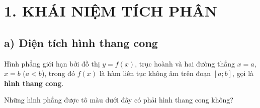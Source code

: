 \documentclass[12pt,a4paper]{extarticle}
\begin{document}
\makeheadbox[headerright={Chương 4},chude={Bài 2},tieude={Tích phân},dinhdang={Giải tích},lop={12 },gv={Nguyễn Lê Minh Ngọc}]
\vspace{2em}
\section*{\color{blue!80!black}1. KHÁI NIỆM TÍCH PHÂN}
\subsection*{\color{blue!80!black}a) Diện tích hình thang cong}
\begin{tcolorbox}[
    colback=blue!5!white,
    colframe=blue!75!black,
    sharp corners,
    boxrule=0pt,
    leftrule=3pt,
    top=8pt,
    bottom=8pt,
    left=12pt
]
    Hình phẳng giới hạn bởi đồ thị $y = f(x)$, trục hoành và hai đường thẳng $x = a$, $x = b$ ($a < b$), trong đó $f(x)$ là hàm liên tục không âm trên đoạn $[a; b]$, gọi là \textbf{hình thang cong}.
\end{tcolorbox}
\vspace{1.5em}
 Những hình phẳng được tô màu dưới đây có phải hình thang cong không?
\end{document}
